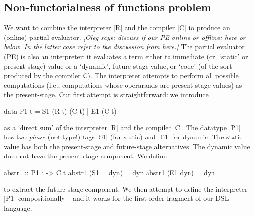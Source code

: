 \documentclass[preprint]{sigplanconf}
\newcommand{\oleg}[1]{{\it [Oleg says: #1]}}
\begin{document}
\subsection{Non-functorialness of functions problem}
\label{S:PE-problem}
We want to combine the interpreter |R| and the compiler |C| to produce
an (online) partial evaluator. \oleg{discuss if our PE online or
  offline: here or below. In the latter case refer to the discussion
  from here.} The partial evaluator (PE) is also an interpreter: it
evaluates a term either to immediate (or, `static' or present-stage)
value or a `dynamic', future-stage value, or `code' (of the sort
produced by the compiler C). The interpreter attempts to perform all
possible computations (i.e., computations whose operarands are
present-stage values) as the present-stage. Our first attempt is
straightforward: we introduce
\begin{code}
data P1 t = S1 (R t) (C t) | E1 (C t)
\end{code}
as a `direct sum' of the interpreter |R| and the compiler |C|. The
datatype |P1| has two \emph{phase} (not type!) tags |S1| 
(for static) and |E1| for dynamic. The static value has both the
present-stage and future-stage alternatives. The dynamic value does
not have the present-stage component. We define
\begin{code}
abstr1 :: P1 t -> C t
abstr1 (S1 _ dyn) = dyn
abstr1 (E1 dyn)   = dyn
\end{code}
to extract the future-stage component. We then attempt to define the
interpreter |P1| compositionally -- and it works for the first-order
fragment of our DSL language.
\end{document}
